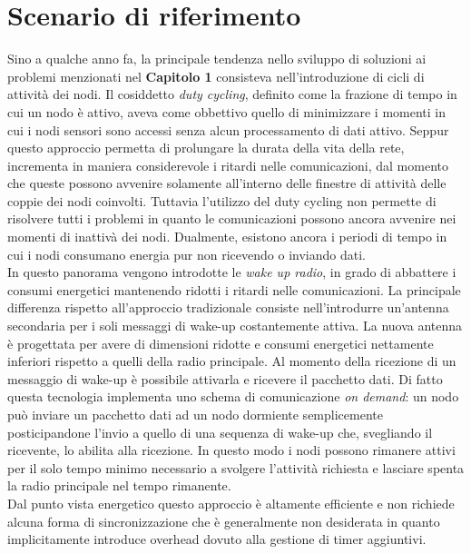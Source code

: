 \documentclass[binding=0.6cm,TFA]{sapthesis}
\begin{document}
\let\cleardoublepage    %
\clearpage
\let\cleardoublepage\clearpage  %

\chapter{Scenario di riferimento}

Sino a qualche anno fa, la principale tendenza nello sviluppo di soluzioni ai problemi menzionati nel \textbf{Capitolo 1} consisteva nell'introduzione di cicli di attività
dei nodi. Il cosiddetto \emph{duty cycling}, definito come la frazione di tempo in cui un nodo è attivo, aveva come obbettivo quello di minimizzare i momenti
in cui i nodi sensori sono accessi senza alcun processamento di dati attivo. Seppur questo approccio permetta di prolungare la durata della vita della rete,
incrementa in maniera considerevole i ritardi nelle comunicazioni, dal momento che queste possono avvenire solamente all'interno delle finestre di attività
delle coppie dei nodi coinvolti. Tuttavia l'utilizzo del duty cycling non permette di risolvere tutti i problemi in quanto le comunicazioni possono ancora
avvenire nei momenti di inattivà dei nodi. Dualmente, esistono ancora i periodi di tempo in cui i nodi consumano energia pur non ricevendo o inviando dati.\\

In questo panorama vengono introdotte le \emph{wake up radio}, in grado di abbattere i consumi energetici mantenendo ridotti i ritardi nelle comunicazioni.
La principale differenza rispetto all'approccio tradizionale consiste nell'introdurre un'antenna secondaria per i soli messaggi di wake-up costantemente
attiva. La nuova antenna è progettata per avere di dimensioni ridotte e consumi energetici nettamente inferiori rispetto a quelli della radio principale.
Al momento della ricezione di un messaggio di wake-up è possibile attivarla e ricevere il pacchetto dati. Di fatto questa tecnologia implementa uno schema
di comunicazione \emph{on demand}: un nodo può inviare un pacchetto dati ad un nodo dormiente semplicemente  posticipandone l'invio a quello di una sequenza
di wake-up che, svegliando il ricevente, lo abilita alla ricezione. In questo modo i nodi possono rimanere attivi per il solo tempo minimo necessario a
svolgere l'attività richiesta e lasciare spenta la radio principale nel tempo rimanente.\\

Dal punto vista energetico questo approccio è altamente efficiente e non richiede alcuna forma di sincronizzazione che è generalmente non desiderata in
quanto implicitamente introduce overhead dovuto alla gestione di timer aggiuntivi.\\
\end{document}
